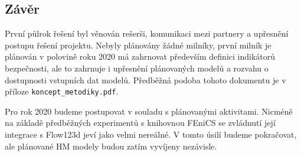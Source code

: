 \documentclass[11pt,a4paper]{article}
\begin{document}
\begin{onehalfspacing}
\section{Závěr}
První půlrok řešení byl věnován rešerši, komunikaci mezi partnery a upřesnění postupu řešení projektu.
Nebyly plánovány žádné milníky, první milník je plánován v polovině roku 2020 má zahrnovat především definici indikátorů bezpečnosti, ale to zahrnuje i upřesnění plánovaných modelů a rozvahu o dostupnosti vstupních dat modelů. Předběžná podoba tohoto dokumentu je v příloze \verb'koncept_metodiky.pdf'.

Pro rok 2020 budeme postupovat v souladu s plánovanými aktivitami. Nicméně na základě předběžných experimentů s knihovnou FEniCS se zvládnutí její integrace s Flow123d jeví jako velmi nereálné. V tomto úsilí budeme pokračovat, ale plánované HM modely budou zatím vyvíjeny nezávisle.


%



\end{onehalfspacing} 
\end{document}
